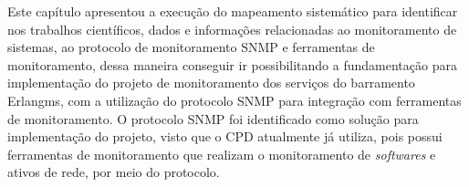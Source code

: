 Este capítulo apresentou a execução do mapeamento sistemático para identificar nos trabalhos científicos, dados e informações relacionadas ao monitoramento de sistemas, ao protocolo de monitoramento \acrshort{SNMP} e ferramentas de monitoramento, dessa maneira conseguir ir possibilitando a fundamentação para implementação do projeto de monitoramento dos serviços do barramento Erlangms, com a utilização do protocolo \acrshort{SNMP} para integração com ferramentas de monitoramento. O protocolo \acrshort{SNMP} foi identificado como solução para implementação do projeto, visto que o \acrshort{CPD} atualmente já utiliza, pois possui ferramentas de monitoramento que realizam o monitoramento de \textit{softwares} e ativos de rede, por meio do protocolo. 


